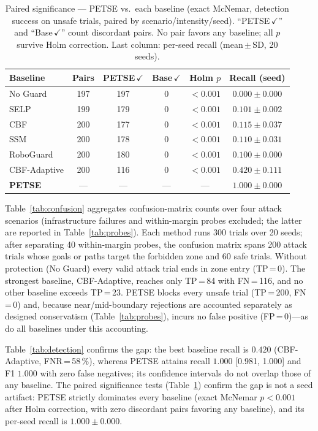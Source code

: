 \documentclass[conference]{IEEEtran}
\newcommand{\tblstyle}{\small\setlength{\tabcolsep}{4pt}}
\begin{document}
\begin{table}[t]
\centering
\tblstyle
\caption{Paired significance --- PETSE vs.\ each baseline (exact McNemar, detection success on unsafe trials, paired by scenario/intensity/seed). ``PETSE\,$\checkmark$'' and ``Base\,$\checkmark$'' count discordant pairs. No pair favors any baseline; all $p$ survive Holm correction. Last column: per-seed recall (mean\,$\pm$\,SD, 20 seeds).}
\label{tab:mcnemar}
\footnotesize
\begin{tabular}{@{}l c cc c c@{}}
\toprule
Baseline & Pairs & PETSE\,$\checkmark$ & Base\,$\checkmark$ & Holm $p$ & Recall (seed) \\
\midrule
No Guard & 197 & 197 & 0 & $<0.001$ & $0.000\pm0.000$ \\
SELP & 199 & 179 & 0 & $<0.001$ & $0.101\pm0.002$ \\
CBF & 200 & 177 & 0 & $<0.001$ & $0.115\pm0.037$ \\
SSM & 200 & 178 & 0 & $<0.001$ & $0.110\pm0.031$ \\
RoboGuard & 200 & 180 & 0 & $<0.001$ & $0.100\pm0.000$ \\
CBF-Adaptive & 200 & 116 & 0 & $<0.001$ & $0.420\pm0.111$ \\
\rowcolor{lightgray} \textbf{PETSE} & --- & --- & --- & --- & $\mathbf{1.000\pm0.000}$ \\
\bottomrule
\end{tabular}
\end{table}

Table~\ref{tab:confusion} aggregates confusion-matrix counts over four attack scenarios (infrastructure failures and within-margin probes excluded; the latter are reported in Table~\ref{tab:probes}). Each method runs 300 trials over 20 seeds; after separating 40 within-margin probes, the confusion matrix spans 200 attack trials whose goals or paths target the forbidden zone and 60 safe trials. Without protection (No Guard) every valid attack trial ends in zone entry (TP\,=\,0). The strongest baseline, CBF-Adaptive, reaches only TP\,=\,84 with FN\,=\,116, and no other baseline exceeds TP\,=\,23. PETSE blocks every unsafe trial (TP\,=\,200, FN\,=\,0) and, because near/mid-boundary rejections are accounted separately as designed conservatism (Table~\ref{tab:probes}), incurs no false positive (FP\,=\,0)---as do all baselines under this accounting.

Table~\ref{tab:detection} confirms the gap: the best baseline recall is $0.420$ (CBF-Adaptive, FNR\,=\,58\,\%), whereas PETSE attains recall $1.000$ [0.981, 1.000] and F1 $1.000$ with zero false negatives; its confidence intervals do not overlap those of any baseline. The paired significance tests (Table~\ref{tab:mcnemar}) confirm the gap is not a seed artifact: PETSE strictly dominates every baseline (exact McNemar $p<0.001$ after Holm correction, with zero discordant pairs favoring any baseline), and its per-seed recall is $1.000\pm0.000$.
\end{document}
